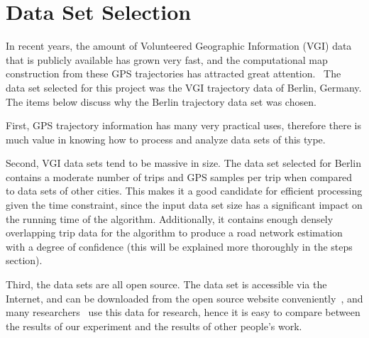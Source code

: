 \documentclass[11pt]{article}
\begin{document}
\section*{Data Set Selection}
\par
In recent years, the amount of Volunteered Geographic Information (VGI) data that is publicly available has grown very fast, and the computational map construction from these GPS trajectories has attracted great attention.~\cite{Wang15} The data set selected for this project was the VGI trajectory data of Berlin, Germany. The items below discuss why the Berlin trajectory data set was chosen.
\par
First, GPS trajectory information has many very practical uses, therefore there is much value in knowing how to process and analyze data sets of this type. 
\par
Second, VGI data sets tend to be massive in size. The data set selected for Berlin contains a moderate number of trips and GPS samples per trip when compared to data sets of other cities. This makes it a good candidate for efficient processing given the time constraint, since the input data set size has a significant impact on the running time of the algorithm. Additionally, it contains enough densely overlapping trip data for the algorithm to produce a road network estimation with a degree of confidence (this will be explained more thoroughly in the steps section).
\par
Third, the data sets are all open source. The data set is accessible via the Internet, and can be downloaded from the open source website conveniently~\cite{link}, and many researchers~\cite{Wang15} use this data for research, hence it is easy to compare between the results of our experiment and the results of other people's work.
\end{document}
